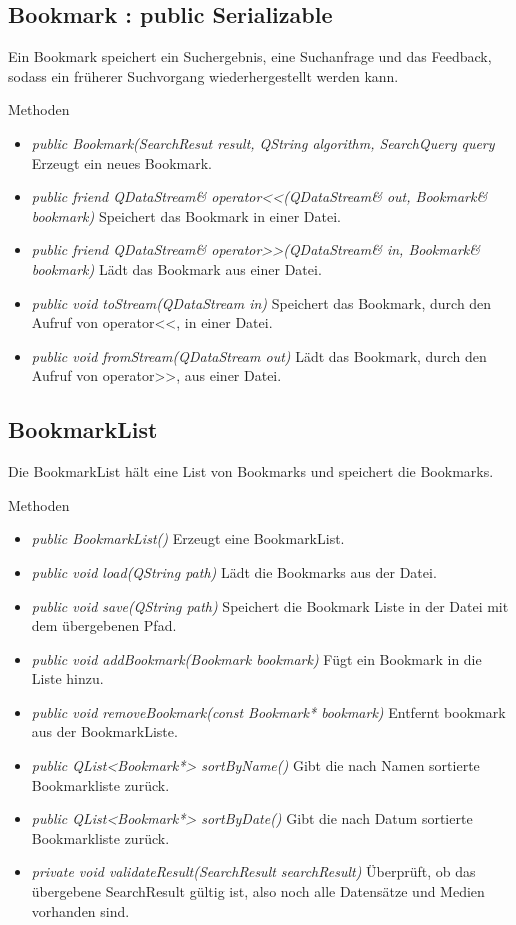 \subsection*{Bookmark : public Serializable}
Ein Bookmark speichert ein Suchergebnis, eine Suchanfrage und das Feedback, sodass ein früherer Suchvorgang wiederhergestellt werden kann.

Methoden
\begin{itemize}
\item \textit{public Bookmark(SearchResut result, QString algorithm, SearchQuery query} Erzeugt ein neues Bookmark.
\item \textit{public friend QDataStream\& operator<<(QDataStream\& out, Bookmark\& bookmark)} Speichert das Bookmark in einer Datei.
\item \textit{public friend QDataStream\& operator>>(QDataStream\& in, Bookmark\& bookmark)} Lädt das Bookmark aus einer Datei.
\item \textit{public void toStream(QDataStream in)} Speichert das Bookmark, durch den Aufruf von operator<<, in einer Datei.
\item \textit{public void fromStream(QDataStream out)} Lädt das Bookmark, durch den Aufruf von operator>>, aus einer Datei.
\end{itemize}

\subsection*{BookmarkList}
Die BookmarkList hält eine List von Bookmarks und speichert die Bookmarks.

Methoden
\begin{itemize}
\item \textit{public BookmarkList()} Erzeugt eine BookmarkList.
\item \textit{public void load(QString path)} Lädt die Bookmarks aus der Datei.
\item \textit{public void save(QString path)} Speichert die Bookmark Liste in der Datei mit dem übergebenen Pfad.
\item \textit{public void addBookmark(Bookmark bookmark)} Fügt ein Bookmark in die Liste hinzu.
\item \textit{public void removeBookmark(const Bookmark* bookmark)} Entfernt bookmark aus der BookmarkListe.
\item \textit{public QList<Bookmark*> sortByName()} Gibt die nach Namen sortierte Bookmarkliste zurück.
\item \textit{public QList<Bookmark*> sortByDate()} Gibt die nach Datum sortierte Bookmarkliste zurück.
\item \textit{private void validateResult(SearchResult searchResult)} Überprüft, ob das übergebene SearchResult gültig ist, also noch alle Datensätze und Medien vorhanden sind.
\end{itemize}


